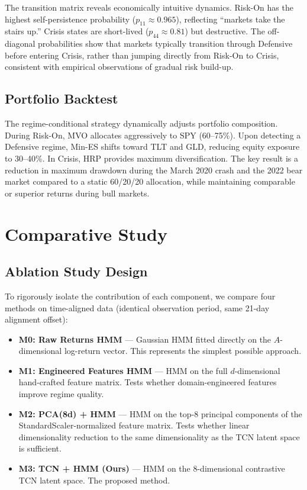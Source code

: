 The transition matrix reveals economically intuitive dynamics. Risk-On has the highest self-persistence probability ($p_{11} \approx 0.965$), reflecting ``markets take the stairs up.'' Crisis states are short-lived ($p_{44} \approx 0.81$) but destructive. The off-diagonal probabilities show that markets typically transition through Defensive before entering Crisis, rather than jumping directly from Risk-On to Crisis, consistent with empirical observations of gradual risk build-up.

\subsection{Portfolio Backtest}

The regime-conditional strategy dynamically adjusts portfolio composition. During Risk-On, MVO allocates aggressively to SPY (60--75\%). Upon detecting a Defensive regime, Min-ES shifts toward TLT and GLD, reducing equity exposure to 30--40\%. In Crisis, HRP provides maximum diversification. The key result is a reduction in maximum drawdown during the March 2020 crash and the 2022 bear market compared to a static 60/20/20 allocation, while maintaining comparable or superior returns during bull markets.

\section{Comparative Study}
\label{sec:ablation}

\subsection{Ablation Study Design}

To rigorously isolate the contribution of each component, we compare four methods on time-aligned data (identical observation period, same 21-day alignment offset):

\begin{itemize}
    \item \textbf{M0: Raw Returns HMM} --- Gaussian HMM fitted directly on the $A$-dimensional log-return vector. This represents the simplest possible approach.
    \item \textbf{M1: Engineered Features HMM} --- HMM on the full $d$-dimensional hand-crafted feature matrix. Tests whether domain-engineered features improve regime quality.
    \item \textbf{M2: PCA(8d) + HMM} --- HMM on the top-8 principal components of the StandardScaler-normalized feature matrix. Tests whether linear dimensionality reduction to the same dimensionality as the TCN latent space is sufficient.
    \item \textbf{M3: TCN + HMM (Ours)} --- HMM on the 8-dimensional contrastive TCN latent space. The proposed method.
\end{itemize}

